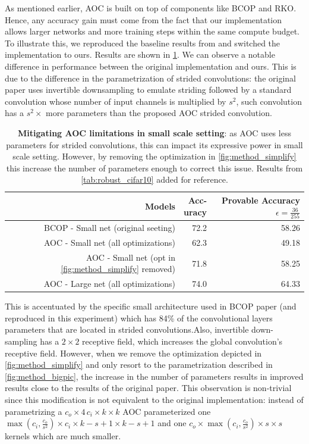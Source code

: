     As mentioned earlier, AOC is built on top of components like BCOP and RKO. Hence, any accuracy gain must come from the fact that our implementation allows larger networks and more training steps within the same compute budget. To illustrate this, we reproduced the baseline results from \cite{li_preventing_2019} and switched the implementation to ours. Results are shown in \cref{tab:bcop_replication}. We can observe a notable difference in performance between the original implementation and ours. This is due to the difference in the parametrization of strided convolutions: the original paper uses invertible downsampling to emulate striding followed by a standard convolution whose number of input channels is multiplied by $s^2$, such convolution has a $s^2\times$ more parameters than the proposed AOC strided convolution.
        \begin{table}%
        \centering
            \begin{tabular}{rrr}
            \toprule
                    Models & \makecell{Acc-\\uracy} &  \makecell{Provable \\ Accuracy \\ $\epsilon = \frac{36}{255}$}  \\
            \midrule
              BCOP - Small net (original seeting) & 72.2 & 58.26 \\
              AOC - Small net (all optimizations) & 62.3 & 49.18 \\
              AOC - Small net (opt in \cref{fig:method_simplify} removed) & 71.8 & 58.25 \\
              \hline
              AOC - Large net (all optimizations) & 74.0 & 64.33 \\
            \bottomrule
            \end{tabular}
        \caption{\textbf{Mitigating AOC limitations in small scale setting}: as AOC uses less parameters for strided convolutions, this can impact its expressive power in small scale setting. However, by removing the optimization in \cref{fig:method_simplify} this increase the number of parameters enough to correct this issue. Results from \cref{tab:robust_cifar10} added for reference.}
        \label{tab:bcop_replication}
    \end{table}
     This is accentuated by the specific small architecture used in BCOP paper (and reproduced in this experiment) which has 84\% of the convolutional layers parameters that are located in strided convolutions.Also, invertible down-sampling has a $2 \times 2$ receptive field, which increases the global convolution's receptive field. However, when we remove the optimization depicted in \cref{fig:method_simplify} and only resort to the parametrization described in \cref{fig:method_bigpic}, the increase in the number of parameters results in improved results close to the results of the original paper. This observation is non-trivial since this modification is not equivalent to the original implementation: instead of parametrizing a $c_o \times 4 \, c_i \times k \times k$ AOC parameterized one $\max(c_i, \frac{c_o}{s^2}) \times c_i \times k-s+1 \times k-s+1$  and one $c_o \times \max(c_i, \frac{c_o}{s^2}) \times s \times s$ kernels which are much smaller.

